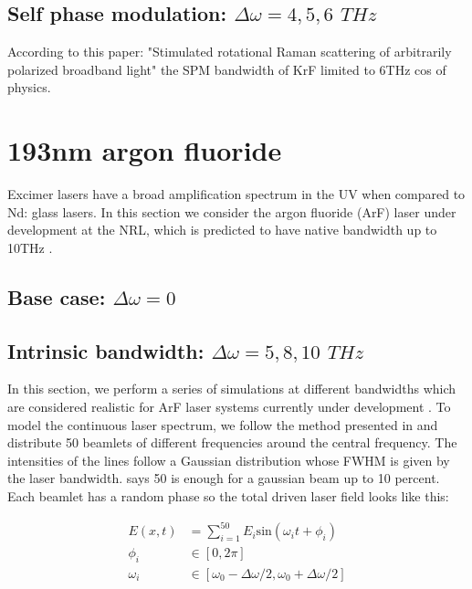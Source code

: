 \subsection{Self phase modulation: $\Delta\omega=4,5,6$ $\si{THz}$}

According to this paper: "Stimulated rotational Raman scattering of arbitrarily polarized broadband light" \citep{Lehmberg2020} the SPM bandwidth of KrF limited to 6THz cos of physics.

\section{193nm argon fluoride}\label{sec:193}
Excimer lasers have a broad amplification spectrum in the UV when compared to Nd: glass lasers. In this section we consider the argon fluoride (ArF) laser under development at the NRL, which is predicted to have native bandwidth up to 10THz \citep{Obenschain2020}.

\subsection{Base case: $\Delta\omega=0$}

\subsection{Intrinsic bandwidth: $\Delta\omega=5,8,10$ $\si{THz}$}
In this section, we perform a series of simulations at different bandwidths which are considered realistic for ArF laser systems currently under development \citep{Obenschain2020}. To model the continuous laser spectrum, we follow the method presented in \citet{Bates2020} and distribute 50 beamlets of different frequencies around the central frequency. The intensities of the lines follow a Gaussian distribution whose FWHM is given by the laser bandwidth. \citet{Follett2019} says 50 is enough for a gaussian beam up to 10 percent. Each beamlet has a random phase so the total driven laser field looks like this:



\begin{equation}
\begin{aligned}
	E(x,t) &= \sum_{i=1}^{50} E_i \mathrm{sin}(\omega_i t + \phi_i) \\
	\phi_i & \in  [0,2\pi] \\
	\omega_i & \in [\omega_0 - \Delta\omega / 2, \omega_0 + \Delta\omega / 2]
\end{aligned}
\end{equation}

